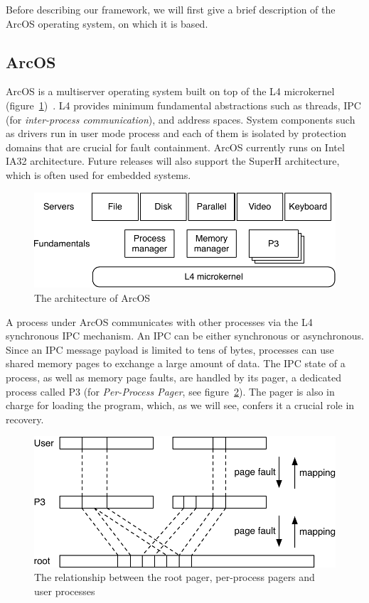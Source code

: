 \documentclass{acm_proc_article-sp}
\begin{document}
Before describing our framework, we will first give a brief description of the ArcOS operating system, on which it is based.

\subsection{ArcOS}
\label{s:arc}

ArcOS is a multiserver operating system built on top of the L4 microkernel (figure~\ref{fig:arc})~\cite{L4X2}.  L4 provides minimum fundamental abstractions such as threads, IPC (for \emph{inter-process communication}), and address spaces. System components such as drivers run in user mode process and each of them is isolated by protection domains that are crucial for fault containment. ArcOS currently runs on Intel IA32 architecture.  Future releases will also support the SuperH architecture, which is often used for embedded systems.

\begin{figure}[ht]
\centering
\includegraphics[scale=0.5]{figures/architecture}
\caption{The architecture of ArcOS}
\label{fig:arc}
\end{figure}

A process under ArcOS communicates with other processes via the L4 synchronous IPC mechanism.  An IPC can be either synchronous or asynchronous.  Since an IPC message payload is limited to tens of bytes, processes can use shared memory pages to exchange a large amount of data. The IPC state of a process, as well as memory page faults, are handled by its pager, a dedicated process called P3 (for \emph{Per-Process Pager}, see figure~\ref{fig:p3}). The pager is also in charge for loading the program, which, as we will see, confers it a crucial role in recovery.

\begin{figure}[ht]
\centering
\includegraphics[scale=0.5]{figures/p3}
\caption{The relationship between the root pager, per-process pagers and user processes}
\label{fig:p3}
\end{figure}
\end{document}
